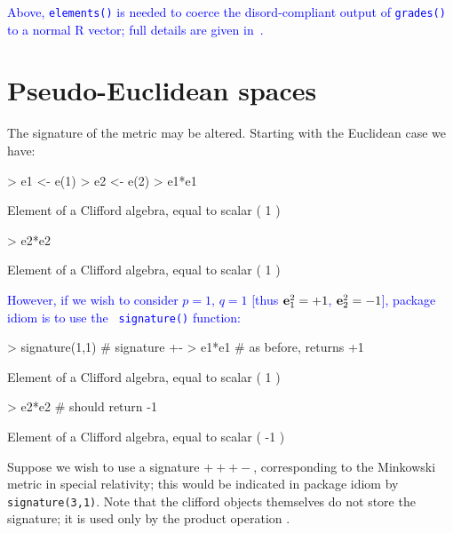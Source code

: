 \documentclass{birkjour}
\theoremstyle{definition}
\theoremstyle{remark}
\numberwithin{equation}{section}
\begin{document}
\textcolor{blue}{Above, {\tt elements()} is needed to coerce the
  disord-compliant output of {\tt grades()} to a normal R vector; full
  details are given in~\cite{hankin2022_disordR}.}

\section{Pseudo-Euclidean spaces}

The signature of the metric may be altered.  Starting with the
Euclidean case we have:
    
\begin{Schunk}
\begin{Sinput}
> e1 <- e(1)
> e2 <- e(2)
> e1*e1
\end{Sinput}
\begin{Soutput}
Element of a Clifford algebra, equal to
scalar ( 1 )
\end{Soutput}
\begin{Sinput}
> e2*e2
\end{Sinput}
\begin{Soutput}
Element of a Clifford algebra, equal to
scalar ( 1 )
\end{Soutput}
\end{Schunk}

\textcolor{blue}{However, if we wish to consider $p=1$, $q=1$ [thus
    ${\bf e}_{1}^2=+1$, ${\bf e}_{2}^2=-1$], package idiom is to use the {\tt
    signature()} function:}

\begin{Schunk}
\begin{Sinput}
> signature(1,1)  # signature +-
> e1*e1 # as before, returns +1
\end{Sinput}
\begin{Soutput}
Element of a Clifford algebra, equal to
scalar ( 1 )
\end{Soutput}
\begin{Sinput}
> e2*e2 # should return -1
\end{Sinput}
\begin{Soutput}
Element of a Clifford algebra, equal to
scalar ( -1 )
\end{Soutput}
\end{Schunk}

Suppose we wish to use a signature $+++-$, corresponding to the
Minkowski metric in special relativity; this would be indicated in
package idiom by {\tt signature(3,1)}.  Note that the clifford objects
themselves do not store the signature; it is used only by the product
operation {\tt *}.
\end{document}
